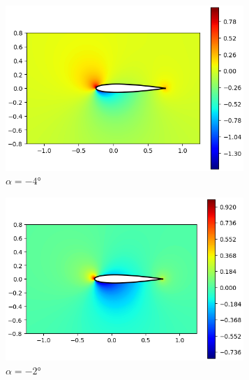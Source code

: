 \documentclass[letterpaper, openright, 12pt]{book}
\begin{document}
    \begin{figure}[htbp!]
        \centering
        \begin{subfigure}[c]{0.48\textwidth}
            \includegraphics[keepaspectratio, width=0.99\textwidth]
                {./img/potential_flow_cp_-4}
            \caption{$\alpha = -4\si{\degree}$}
            \label{fig:potential_flow_cp-4}
        \end{subfigure}
        \hfill
        \begin{subfigure}[c]{0.48\textwidth}
            \includegraphics[keepaspectratio, width=0.99\textwidth]
                {./img/potential_flow_cp_-2}
            \caption{$\alpha = -2\si{\degree}$}
            \label{fig:potential_flow_cp_-2}
        \end{subfigure}
        \begin{subfigure}[c]{0.48\textwidth}

\end{subfigure}
\end{figure}
\end{document}
